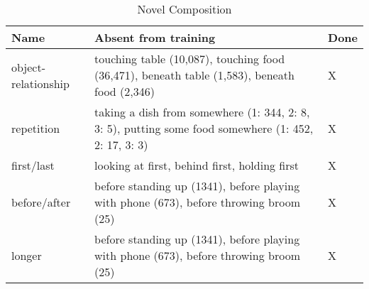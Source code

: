 \documentclass{article}
\begin{document}
\begin{longtable}[]{|p{2cm}|p{10cm}|p{.5cm}|}
    \caption{Novel Composition}
    \label{tab:table1}
    \hline
    \textbf{Name} & \textbf{Absent from training} & Done \\
    \hline
    object-relationship & touching table (10,087), touching food (36,471), beneath table (1,583), beneath food (2,346) &X  \\
    \hline
    repetition & taking a dish from somewhere (1: 344, 2: 8, 3: 5), putting some food somewhere (1: 452, 2: 17, 3: 3) & X \\
    \hline
    first/last & looking at first, behind first, holding first & X \\
    \hline
    before/after & before standing up (1341), before playing with phone (673), before throwing broom (25) & X \\
    \hline
    longer & before standing up (1341), before playing with phone (673), before throwing broom (25) &  X\\
    \hline
    
\end{longtable}
\end{document}

